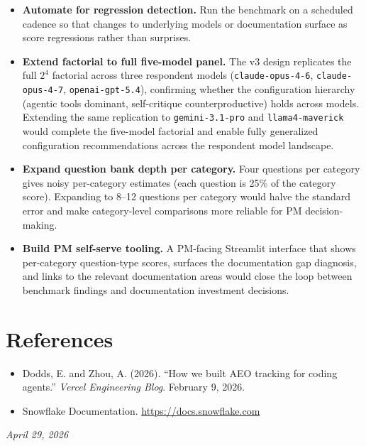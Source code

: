 \documentclass[10pt,letterpaper]{article}
\begin{document}
\begin{itemize}[nosep]
  \item \textbf{Automate for regression detection.} Run the benchmark on a scheduled cadence so that changes to underlying models or documentation surface as score regressions rather than surprises.
  \item \textbf{Extend factorial to full five-model panel.} The v3 design replicates the full $2^4$ factorial across three respondent models (\texttt{claude-opus-4-6}, \texttt{claude-opus-4-7}, \texttt{openai-gpt-5.4}), confirming whether the configuration hierarchy (agentic tools dominant, self-critique counterproductive) holds across models. Extending the same replication to \texttt{gemini-3.1-pro} and \texttt{llama4-maverick} would complete the five-model factorial and enable fully generalized configuration recommendations across the respondent model landscape.
  \item \textbf{Expand question bank depth per category.} Four questions per category gives noisy per-category estimates (each question is 25\% of the category score). Expanding to 8--12 questions per category would halve the standard error and make category-level comparisons more reliable for PM decision-making.
  \item \textbf{Build PM self-serve tooling.} A PM-facing Streamlit interface that shows per-category question-type scores, surfaces the documentation gap diagnosis, and links to the relevant documentation areas would close the loop between benchmark findings and documentation investment decisions.
\end{itemize}

\section*{References}

\begin{itemize}[nosep,leftmargin=*]
  \item Dodds, E. and Zhou, A. (2026). ``How we built AEO tracking for coding agents.'' \emph{Vercel Engineering Blog}. February 9, 2026.
  \item Snowflake Documentation. \url{https://docs.snowflake.com}
\end{itemize}

\vfill
\begin{center}
\textit{April 29, 2026}
\end{center}
\end{document}
